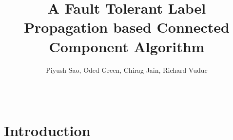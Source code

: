 \documentclass{sig-alternate-05-2015}
\begin{document}

\title{A Fault Tolerant Label Propagation based Connected Component Algorithm }

  \author{
  \alignauthor
    Piyush Sao, Oded Green, Chirag Jain, Richard Vuduc \\
      \\
      \\
  }


\maketitle



\section{Introduction}

\end{document}
